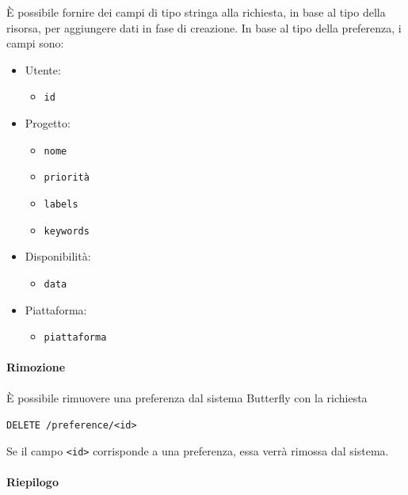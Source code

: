 È possibile fornire dei campi di tipo stringa alla richiesta, in base al tipo della risorsa, per aggiungere dati in fase di creazione.
In base al tipo della preferenza, i campi sono:
\begin{itemize}[noitemsep]
    \item Utente:
        \begin{itemize}[noitemsep]
            \item \texttt{id}
        \end{itemize}
    \item Progetto:
        \begin{itemize}[noitemsep]
            \item \texttt{nome}
            \item \texttt{priorità}
            \item \texttt{labels}
            \item \texttt{keywords}
        \end{itemize}
    \item Disponibilità:
        \begin{itemize}[noitemsep]
            \item \texttt{data}
        \end{itemize}
    \item Piattaforma:
        \begin{itemize}[noitemsep]
            \item \texttt{piattaforma}
        \end{itemize}
\end{itemize}


\paragraph{Rimozione}

È possibile rimuovere una preferenza dal sistema Butterfly con la richiesta
\begin{center}
    \texttt{DELETE /preference/<id>}
\end{center}

Se il campo \texttt{<id>} corrisponde a una preferenza, essa verrà rimossa dal sistema.

\paragraph{Riepilogo}

